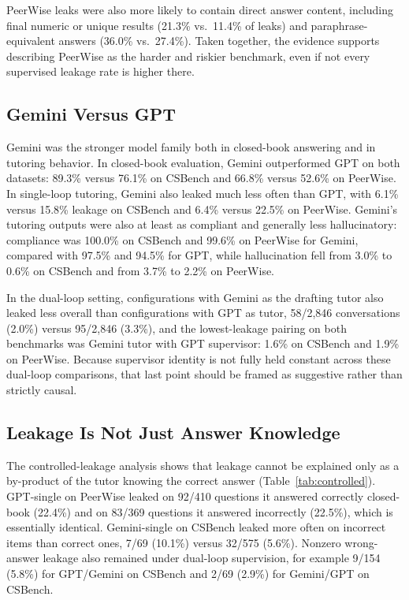 \documentclass[sigconf,review,anonymous]{acmart}
\begin{document}
PeerWise leaks were also more likely to contain direct answer content, including final numeric or unique results (21.3\% vs.\ 11.4\% of leaks) and paraphrase-equivalent answers (36.0\% vs.\ 27.4\%). Taken together, the evidence supports describing PeerWise as the harder and riskier benchmark, even if not every supervised leakage rate is higher there.

\subsection{Gemini Versus GPT}

Gemini was the stronger model family both in closed-book answering and in tutoring behavior. In closed-book evaluation, Gemini outperformed GPT on both datasets: 89.3\% versus 76.1\% on CSBench and 66.8\% versus 52.6\% on PeerWise. In single-loop tutoring, Gemini also leaked much less often than GPT, with 6.1\% versus 15.8\% leakage on CSBench and 6.4\% versus 22.5\% on PeerWise. Gemini’s tutoring outputs were also at least as compliant and generally less hallucinatory: compliance was 100.0\% on CSBench and 99.6\% on PeerWise for Gemini, compared with 97.5\% and 94.5\% for GPT, while hallucination fell from 3.0\% to 0.6\% on CSBench and from 3.7\% to 2.2\% on PeerWise.

In the dual-loop setting, configurations with Gemini as the drafting tutor also leaked less overall than configurations with GPT as tutor, 58/2,846 conversations (2.0\%) versus 95/2,846 (3.3\%), and the lowest-leakage pairing on both benchmarks was Gemini tutor with GPT supervisor: 1.6\% on CSBench and 1.9\% on PeerWise. Because supervisor identity is not fully held constant across these dual-loop comparisons, that last point should be framed as suggestive rather than strictly causal.

\subsection{Leakage Is Not Just Answer Knowledge}

The controlled-leakage analysis shows that leakage cannot be explained only as a by-product of the tutor knowing the correct answer (Table~\ref{tab:controlled}). GPT-single on PeerWise leaked on 92/410 questions it answered correctly closed-book (22.4\%) and on 83/369 questions it answered incorrectly (22.5\%), which is essentially identical. Gemini-single on CSBench leaked more often on incorrect items than correct ones, 7/69 (10.1\%) versus 32/575 (5.6\%). Nonzero wrong-answer leakage also remained under dual-loop supervision, for example 9/154 (5.8\%) for GPT/Gemini on CSBench and 2/69 (2.9\%) for Gemini/GPT on CSBench.
\end{document}
